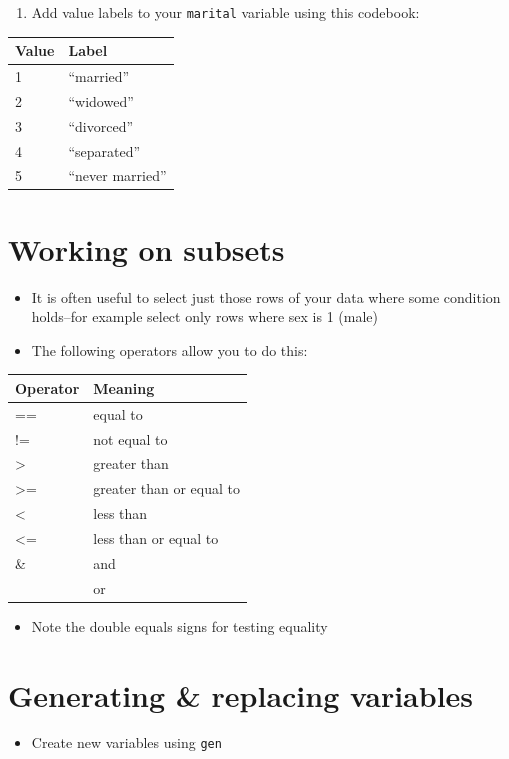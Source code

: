 \documentclass[]{book}
\providecommand{\tightlist}{%
  \setlength{\itemsep}{0pt}\setlength{\parskip}{0pt}}
\begin{document}
\begin{enumerate}
\def\labelenumi{\arabic{enumi}.}
\tightlist
\item
  Add value labels to your \texttt{marital} variable using this
  codebook:
\end{enumerate}

\begin{longtable}[]{@{}ll@{}}
\toprule
Value & Label\tabularnewline
\midrule
\endhead
1 & ``married''\tabularnewline
2 & ``widowed''\tabularnewline
3 & ``divorced''\tabularnewline
4 & ``separated''\tabularnewline
5 & ``never married''\tabularnewline
\bottomrule
\end{longtable}

\section{Working on subsets}\label{working-on-subsets}

\begin{itemize}
\tightlist
\item
  It is often useful to select just those rows of your data where some
  condition holds--for example select only rows where sex is 1 (male)
\item
  The following operators allow you to do this:
\end{itemize}

\begin{longtable}[]{@{}ll@{}}
\toprule
Operator & Meaning\tabularnewline
\midrule
\endhead
== & equal to\tabularnewline
!= & not equal to\tabularnewline
\textgreater{} & greater than\tabularnewline
\textgreater{}= & greater than or equal to\tabularnewline
\textless{} & less than\tabularnewline
\textless{}= & less than or equal to\tabularnewline
\& & and\tabularnewline
\textbar{} & or\tabularnewline
\bottomrule
\end{longtable}

\begin{itemize}
\tightlist
\item
  Note the double equals signs for testing equality
\end{itemize}

\section{Generating \& replacing
variables}\label{generating-replacing-variables}

\begin{itemize}
\tightlist
\item
  Create new variables using \texttt{gen}
\end{itemize}
\end{document}
